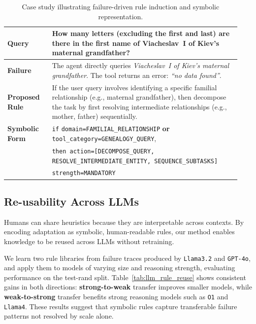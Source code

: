 \documentclass[11pt]{article}
\newcommand{\rand}{{test-rand}\xspace}
\begin{document}
\begin{table}[t]
\centering
\small
\caption{Case study illustrating failure-driven rule induction and symbolic representation.}
\label{tab:case-study}
\begin{tabular}{p{0.18\linewidth} p{0.76\linewidth}}
\toprule
\textbf{Query} &
How many letters (excluding the first and last) are there in the first name of
Viacheslav~I of Kiev's maternal grandfather? \\
\midrule
\textbf{Failure} &
The agent directly queries \textit{Viacheslav~I of Kiev's maternal grandfather}.
The tool returns an error: \textit{``no data found''}. \\
\midrule
\textbf{Proposed Rule} &
If the user query involves identifying a specific familial relationship (e.g., maternal
grandfather), then decompose the task by first resolving intermediate relationships
(e.g., mother, father) sequentially. \\
\midrule
\textbf{Symbolic Form} &
\texttt{if} \;
\texttt{domain=FAMILIAL\_RELATIONSHIP} \;\textbf{or}\;
\texttt{tool\_category=GENEALOGY\_QUERY}, \\
& \texttt{then action=[DECOMPOSE\_QUERY, RESOLVE\_INTERMEDIATE\_ENTITY, SEQUENCE\_SUBTASKS]} \\
& \texttt{strength=MANDATORY} \\
\bottomrule
\end{tabular}
\end{table}






\subsection{Re-usability Across LLMs}

Humans can share heuristics because they are interpretable across contexts. By encoding
adaptation as symbolic, human-readable rules, our method enables knowledge to be reused
across LLMs without retraining.

We learn two rule libraries from failure traces produced by \texttt{Llama3.2} and
\texttt{GPT-4o}, and apply them to models of varying size and reasoning strength, evaluating
performance on the \rand split. Table~\ref{tab:llm_rule_reuse} shows consistent gains in both
directions: \textbf{strong-to-weak} transfer improves smaller models, while
\textbf{weak-to-strong} transfer benefits strong reasoning models such as \texttt{O1} and
\texttt{Llama4}. These results suggest that symbolic rules capture transferable failure
patterns not resolved by scale alone.
\end{document}

